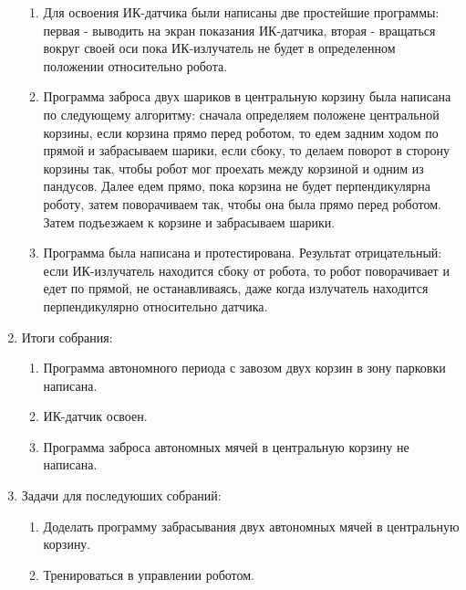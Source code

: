 \begin{enumerate}
\begin{enumerate}
		\item Для освоения ИК-датчика были написаны две простейшие программы: первая - выводить на экран показания ИК-датчика, вторая - вращаться вокруг своей оси пока ИК-излучатель не будет в определенном положении относительно робота.  
		
		\item Программа заброса двух шариков в центральную корзину была написана по следующему алгоритму: сначала определяем положене центральной корзины, если корзина прямо перед роботом, то едем задним ходом по прямой и забрасываем шарики, если сбоку, то делаем поворот в сторону корзины так, чтобы робот мог проехать между корзиной и одним из пандусов. Далее едем прямо, пока корзина не будет перпендикулярна роботу, затем поворачиваем так, чтобы она была прямо перед роботом. Затем подъезжаем к корзине и забрасываем шарики.
		
		\item Программа была написана и протестирована. Результат отрицательный: если ИК-излучатель находится сбоку от робота, то робот поворачивает и едет по прямой, не останавливаясь, даже когда излучатель находится перпендикулярно относительно датчика.   
	\end{enumerate}
	\item Итоги собрания:
	\begin{enumerate}
		\item Программа автономного периода с завозом двух корзин в зону парковки написана.
		
		\item ИК-датчик освоен.
		
		\item Программа заброса автономных мячей в центральную корзину не написана.
	\end{enumerate}
	\item Задачи для последуюших собраний:
	\begin{enumerate}
		\item Доделать программу забрасывания двух автономных мячей в центральную корзину.
		
		\item Тренироваться в управлении роботом.
	\end{enumerate}
\end{enumerate}
\fillpage
